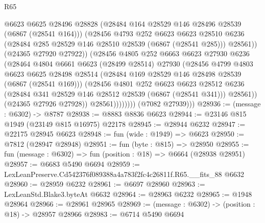 \begin{lexlean}{R65}
\begin{coremodule}
{                          @6623
                          @6625
                          @28496
                          @28828
                          (@28484 @164 @28529 @146 @28496 @28539 (@6867 (@28541 @164)))
                          (@28456
                            @4793
                            @252
                            @6623
                            @6623
                            @28510
                            @6236
                            (@28484 @285 @28529 @146 @28510 @28539 (@6867 (@28541 @285)))
                            @28561))
                        (@24365 @27920 @27922))
                      (@28456
                        @4805
                        @252
                        @6663
                        @6623
                        @27930
                        @6236
                        (@28464
                          @4804
                          @6661
                          @6623
                          (@28499 @28514)
                          @27930
                          (@28456
                            @4799
                            @4803
                            @6623
                            @6625
                            @28498
                            @28514
                            (@28484 @169 @28529 @146 @28498 @28539 (@6867 (@28541 @169)))
                            (@28456
                              @4801
                              @252
                              @6623
                              @6623
                              @28512
                              @6236
                              (@28484 @341 @28529 @146 @28512 @28539 (@6867 (@28541 @341)))
                              @28561))
                          (@24365 @27926 @27928))
                        @28561))))))))
        (@7082 @27939)))
@28936 := (message : @6302) -> @8787
@28938 := @8883 @8836 @6623
@28944 := @23146 @815 @1949 (@23149 @815 @16975) @22178
@28945 := @28944 @6232
@28947 := @22175 @28945 @6623
@28948 := fun (wide : @1949) => @6623
@28950 := @7812 (@28947 @28948)
@28951 := fun (byte : @815) => @28950
@28955 := fun (message : @6302) => fun (position : @18) => @6664 (@28938 @28951)
@28957 := @6683 @5490 @6694
@28959 := LexLeanPreserve.Cd542376f089388a4a783f2fc4c26811f.R65.__fits_88 @6632
@28960 := @28959 @6232
@28961 := @6697 @28960
@28963 := LexLeanStd.Blake3.byteAt @6632
@28964 := @28963 @6232
@28965 := @1948 @28964
@28966 := @28961 @28965
@28969 := (message : @6302) -> (position : @18) -> @28957 @28966
@28983 := @6714
    @5490
    @6694
}
\end{coremodule}
\end{lexlean}
